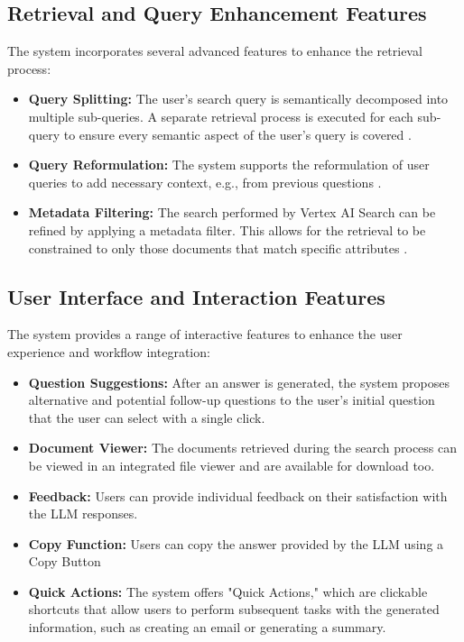 \documentclass[
	english,
	ruledheaders=section,%
	class=report,%
	thesis={type=bachelor},%
	accentcolor=1b,%
	custommargins=true,%
	marginpar=false,%
	parskip=half-,%
	fontsize=11pt,%
	DIV=14,
]{tudapub}
\begin{document}
\subsection{Retrieval and Query Enhancement Features}
The system incorporates several advanced features to enhance the retrieval process:
\begin{itemize}
    \item \textbf{Query Splitting:} The user's search query is semantically decomposed into multiple sub-queries. A separate retrieval process is executed for each sub-query to ensure every semantic aspect of the user's query is covered \parencite[p.~8]{Ammann2025}.
    
    \item \textbf{Query Reformulation:} The system supports the reformulation of user queries to add necessary context, e.g., from previous questions \parencite[pp.~6--7]{Setty2024}.
    
    \item \textbf{Metadata Filtering:} The search performed by Vertex AI Search can be refined by applying a metadata filter. This allows for the retrieval to be constrained to only those documents that match specific attributes \parencite[pp.~7--8]{Setty2024}.
\end{itemize}
\subsection{User Interface and Interaction Features}
The system provides a range of interactive features to enhance the user experience and workflow integration:
\begin{itemize}
    \item \textbf{Question Suggestions:} After an answer is generated, the system proposes alternative and potential follow-up questions to the user's initial question that the user can select with a single click.
    
    \item \textbf{Document Viewer:} The documents retrieved during the search process can be viewed in an integrated file viewer and are available for download too.
    
    \item \textbf{Feedback:} Users can provide individual feedback on their satisfaction with the LLM responses.

    \item \textbf{Copy Function:} Users can copy the answer provided by the LLM using a Copy Button
    
    \item \textbf{Quick Actions:} The system offers "Quick Actions," which are clickable shortcuts that allow users to perform subsequent tasks with the generated information, such as creating an email or generating a summary.
\end{itemize}
\end{document}
